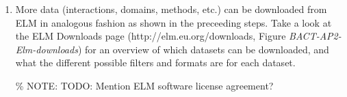 \begin{enumerate}
\item More data (interactions, domains, methods, etc.) can be downloaded from
	ELM in analogous fashion as shown in the preceeding steps. Take a look
	at the ELM Downloads page (http://elm.eu.org/downloads, Figure
	\emph{BACT-AP2-Elm-downloads}) for an overview of which datasets can be
	downloaded, and what the different possible filters and formats are for
	each dataset.  

\% NOTE: TODO: Mention ELM software license agreement?

\end{enumerate}
